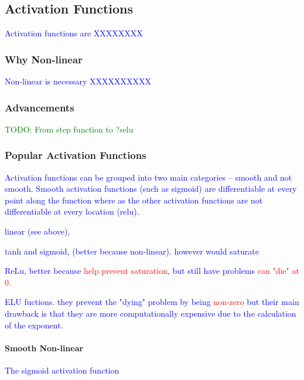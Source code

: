 \subsection{Activation Functions}

\textcolor{blue}{Activation functions are XXXXXXXX}

\subsubsection{Why Non-linear}

\textcolor{blue}{Non-linear is necessary XXXXXXXXXX}

\subsubsection{Advancements}

\textcolor{green}{TODO: From step function to ?selu}

\subsubsection{Popular Activation Functions}

\textcolor{blue}{Activation functions can be grouped into two main categories -- smooth and not smooth. Smooth activation functions (such as sigmoid) are differentiable at every point along the function where as the other activation functions are not differentiable at every location (relu).}


\textcolor{blue}{linear (see above), }
	
\textcolor{blue}{tanh and sigmoid, (better because non-linear). however would saturate}

\textcolor{blue}{ReLu, better because \textcolor{red}{help prevent saturation}, but still have problems \textcolor{red}{can "die" at 0.} }

\textcolor{blue}{ELU fuctions. they prevent the "dying" problem by being \textcolor{red}{non-zero} but their main drawback is that they are more computationally expensive due to the calculation of the exponent.}

\paragraph{Smooth Non-linear}

\textcolor{blue}{The sigmoid activation function}

